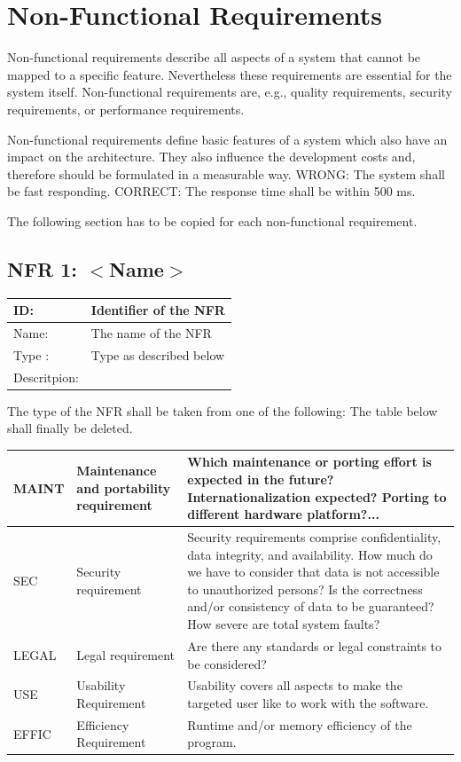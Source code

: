\documentclass[12pt]{article}
\theoremstyle{definition}
\newenvironment{explanation}{%
   \setlength{\parindent}{0pt}
   \itshape
   \color{blue}
}{}
\begin{document}
\section{Non-Functional Requirements}
\begin{explanation}
Non-functional requirements describe all aspects of a system that cannot be mapped to a specific feature. Nevertheless these requirements are essential for the system itself. Non-functional requirements are, e.g., quality requirements, security requirements, or performance requirements.

Non-functional requirements define basic features of a system which also have an impact on the architecture. They also influence the development costs and, therefore should be formulated in a measurable way.
WRONG: The system shall be fast responding.
CORRECT: The response time shall be within 500 ms.

The following section has to be copied for each non-functional requirement.
\end{explanation}

\subsection{NFR 1: $<$Name$>$}
\begin{tabular}{|p{.2\linewidth}|p{.65\linewidth}|}
\hline 
ID: & Identifier of the NFR \\ \hline
Name: & The name of the NFR \\ \hline
Type	: & Type as described below \\ \hline
Descritpion: &  \\ \hline
\end{tabular}

The type of the NFR shall be taken from one of the following: The table below shall finally be deleted.

\begin{tabular}{|p{.15\linewidth}|p{.25\linewidth}|p{.4\linewidth}|}
\hline
MAINT & Maintenance and portability requirement & Which maintenance or porting effort is expected in the future? Internationalization expected? Porting to different hardware platform?... \\ \hline
SEC & Security requirement & Security requirements comprise confidentiality, data integrity, and availability. How much do we have to consider that data is not accessible to unauthorized persons? Is the correctness and/or consistency of data to be guaranteed? How severe are total system faults? \\ \hline
LEGAL & Legal requirement & Are there any standards or legal constraints to be considered? \\ \hline
USE & Usability Requirement & Usability covers all aspects to make the targeted user like to work with the software. \\ \hline
EFFIC & Efficiency Requirement & Runtime and/or memory efficiency of the program. \\ \hline
\end{tabular}
\pagebreak
\end{document}
